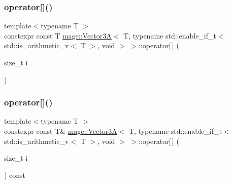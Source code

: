 \subsubsection{\texorpdfstring{operator[]()}{operator[]()}\hspace{0.1cm}{\footnotesize\ttfamily [1/2]}}
{\footnotesize\ttfamily template$<$typename T $>$ \\
constexpr const T \hyperlink{structmage_1_1_vector3_a}{mage\+::\+Vector3A}$<$ T, typename std\+::enable\+\_\+if\+\_\+t$<$ std\+::is\+\_\+arithmetic\+\_\+v$<$ T $>$, void $>$ $>$\+::operator\mbox{[}$\,$\mbox{]} (\begin{DoxyParamCaption}\item[{size\+\_\+t}]{i }\end{DoxyParamCaption})\hspace{0.3cm}{\ttfamily [noexcept]}}

\hypertarget{structmage_1_1_vector3_a_3_01_t_00_01typename_01std_1_1enable__if__t_3_01std_1_1is__arithmetic__7070ab83646a86866d1e3c9d7eeea37a_a06e09b18c8dce7873abe5b2b9c9a3337}{}\label{structmage_1_1_vector3_a_3_01_t_00_01typename_01std_1_1enable__if__t_3_01std_1_1is__arithmetic__7070ab83646a86866d1e3c9d7eeea37a_a06e09b18c8dce7873abe5b2b9c9a3337} 
\subsubsection{\texorpdfstring{operator[]()}{operator[]()}\hspace{0.1cm}{\footnotesize\ttfamily [2/2]}}
{\footnotesize\ttfamily template$<$typename T $>$ \\
constexpr const T\& \hyperlink{structmage_1_1_vector3_a}{mage\+::\+Vector3A}$<$ T, typename std\+::enable\+\_\+if\+\_\+t$<$ std\+::is\+\_\+arithmetic\+\_\+v$<$ T $>$, void $>$ $>$\+::operator\mbox{[}$\,$\mbox{]} (\begin{DoxyParamCaption}\item[{size\+\_\+t}]{i }\end{DoxyParamCaption}) const\hspace{0.3cm}{\ttfamily [noexcept]}}



